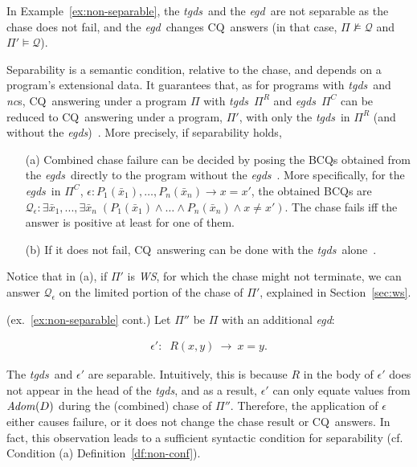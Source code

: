 \documentclass[format=acmsmall, review=false, screen=true]{acmart}
\newcommand{\bcq}{BCQ}
\newcommand{\cq}{CQ}
\newcommand{\mc}[1]{\mathcal{ #1}}
\newcommand{\nit}[1]{{\it #1}}
\newcommand{\nc}{{\em nc}}
\newcommand{\rules}{\Pi^{R}}
\newcommand{\constraints}{\Pi^{C}}
\newcommand{\prg}{\Pi}
\newcommand{\m}{\;\!\!}
\newcommand{\WS}{{\em W\m{}S}}
\newcommand{\vectt}[1]{\bar{#1}}
\newcommand{\egds}{{\em egds}}
\newcommand{\egd}{{\em egd}}
\newcommand{\tgds}{{\em tgds}}
\begin{document}
{In Example~\ref{ex:non-separable}, the \tgds \ and the \egd \ are not separable as the chase does not fail, and the \egd \ changes \cq \ answers (in that case, $\prg \not\models \mc{Q}$ and $\prg' \models \mc{Q}$).

Separability is a semantic condition, relative to the chase, and depends on a program's extensional data. It guarantees that, as for programs with \tgds \ and \nc s, \cq \ answering under a program $\prg$ with \tgds \ $\rules$ and \egds \ $\constraints$  can be reduced to \cq \ answering under a program, $\prg'$, with only the \tgds \ in $\rules$ (and without the \egds)~\cite{cali12is}. More precisely, if separability holds,

\begin{itemize}
  \item[(a)] Combined chase failure can be decided by posing the \bcq s obtained from the \egds \ directly to the program without the \egds~\cite[Theorem~1]{cali12amw}. More specifically, for the \egds \ in $\constraints$, $\epsilon:P_1(\vectt{x}_1), \ldots, P_n(\vectt{x}_n)\rightarrow x=x'$, the obtained \bcq s are $\mc{Q}_\epsilon:\exists \vectt{x}_1,...,\exists \vectt{x}_n\;(P_1(\vectt{x}_1)\wedge \ldots\wedge P_n(\vectt{x}_n)\wedge x\neq x')$. The chase fails iff the answer is positive at least for one of them.
  \item[(b)] If it does not fail, \cq \ answering can be done with the \tgds \ alone~\cite{cali12is,cali12amw}.
\end{itemize}

Notice that in (a), if $\prg'$ is \WS, for which the chase might not terminate, we can answer $\mc{Q}_\epsilon$ on the limited portion of the chase of $\prg'$, explained in Section~\ref{sec:ws}.

\begin{example} (ex.~\ref{ex:non-separable} cont.) Let $\prg''$ be $\prg$ with an additional \egd:

\vspace{-4mm}
\begin{align}\epsilon'\!:\;\;R(x,y)~\rightarrow~x=y.\end{align}
\vspace{-4mm}

\noindent The \tgds \ and $\epsilon'$ are separable. Intuitively, this is because $R$ in the body of $\epsilon'$ does not appear in the head of the \tgds, and as a result, $\epsilon'$ can only equate values from $\nit{Adom}(D)$ during the (combined) chase of $\prg''$. Therefore, the application of $\epsilon$ either causes failure, or it does not change the chase result or \cq \ answers. In fact, this observation leads to a sufficient syntactic condition for separability (cf. Condition (a) Definition~\ref{df:non-conf}).


\end{example}}
\end{document}
